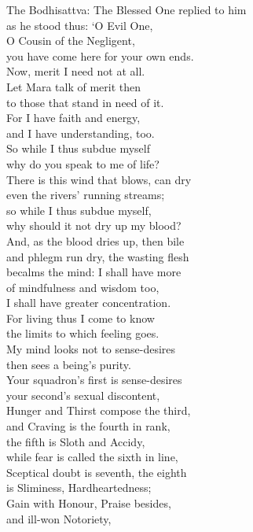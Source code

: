 \begin{MyDescription}[]{The Bodhisattva:}
The Blessed One replied to him\\
as he stood thus: `O Evil One,\\
O Cousin of the Negligent,\\
you have come here for your own ends.\\
Now, merit I need not at all.\\
Let Mara talk of merit then\\
to those that stand in need of it.\\
For I have faith and energy,\\
and I have understanding, too.\\
So while I thus subdue myself\\
why do you speak to me of life?\\
There is this wind that blows, can dry\\
even the rivers' running streams;\\
so while I thus subdue myself,\\
why should it not dry up my blood?\\
And, as the blood dries up, then bile\\
and phlegm run dry, the wasting ﬂesh\\
becalms the mind: I shall have more\\
of mindfulness and wisdom too,\\
I shall have greater concentration.\\
For living thus I come to know\\
the limits to which feeling goes.\\
My mind looks not to sense-desires\\
then sees a being's purity.\\
Your squadron's first is sense-desires\\
your second's sexual discontent,\\
Hunger and Thirst compose the third,\\
and Craving is the fourth in rank,\\
the fifth is Sloth and Accidy,\\
while fear is called the sixth in line,\\
Sceptical doubt is seventh, the eighth\\
is Sliminess, Hardheartedness;\\
Gain with Honour, Praise besides,\\
and ill-won Notoriety,\\

\end{MyDescription}
